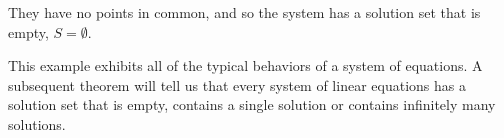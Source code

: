 \documentclass{ximera}
\begin{document}
\begin{problem}
\begin{example}
\begin{question}
\begin{question}
        \begin{feedback}
          They have no points in common, and so the system has a solution set that is empty, $S=\emptyset$.
        \end{feedback}
      \end{question}
    \end{question}

    This example exhibits all of the typical behaviors of a system of
    equations. A subsequent theorem will tell us that every system of
    linear equations has a solution set that is empty, contains a
    single solution or contains infinitely many solutions.
  \end{example}

\end{problem}
\end{document}
